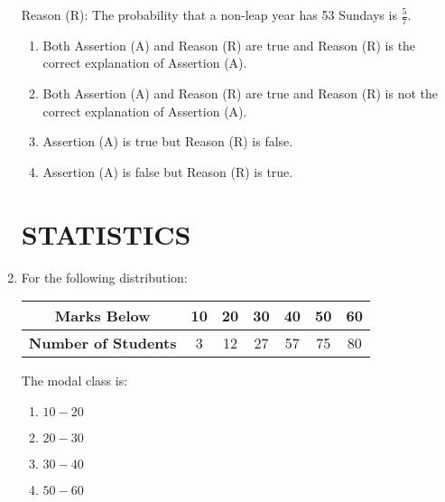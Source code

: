 \documentclass[12pt,-letter paper]{article}
\begin{document}
\begin{enumerate}
Reason (R): The probability that a non-leap year has 53 Sundays is $\frac{5}{7}$.

\begin{enumerate}
    \item Both Assertion (A) and Reason (R) are true and Reason (R) is the correct explanation of Assertion (A).
    \item Both Assertion (A) and Reason (R) are true and Reason (R) is not the correct explanation of Assertion (A).
    \item Assertion (A) is true but Reason (R) is false.
    \item Assertion (A) is false but Reason (R) is true.
\end{enumerate}
\begin{center}
\section*{STATISTICS}
\end{center}
\item For the following distribution:

\begin{center}
\begin{tabular}{|c|c|c|c|c|c|c|}
\hline
\textbf{Marks Below} & 10 & 20 & 30 & 40 & 50 & 60 \\
\hline
\textbf{Number of Students} & 3 & 12 & 27 & 57 & 75 & 80 \\
\hline
\end{tabular}
\end{center}

The modal class is:

\begin{enumerate}
    \item $10-20$
    \item $20-30$
    \item $30-40$
    \item $50-60$
\end{enumerate}
\end{enumerate}
\end{document}
